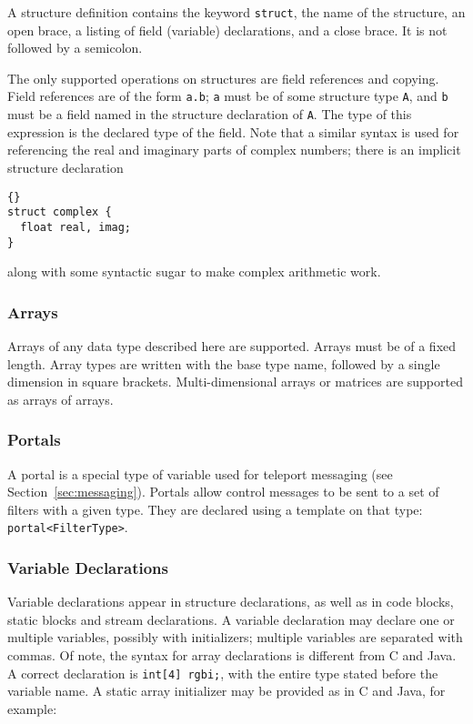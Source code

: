 \documentclass[11pt]{article}
\begin{document}
A structure definition contains the keyword \lstinline|struct|, the name
of the structure, an open brace, a listing of field (variable)
declarations, and a close brace.  It is not followed by a semicolon.

The only supported operations on structures are field references and
copying.  Field references are of the form \lstinline|a.b|; \lstinline|a| must
be of some structure type \lstinline|A|, and \lstinline|b| must be a field named
in the structure declaration of \lstinline|A|.  The type of this expression
is the declared type of the field.  Note that a similar syntax is used
for referencing the real and imaginary parts of complex numbers; there
is an implicit structure declaration

\begin{lstlisting}{}
struct complex {
  float real, imag;
}
\end{lstlisting}{}

\noindent
along with some syntactic sugar to make complex arithmetic work.

\subsubsection{Arrays}

Arrays of any data type described here are supported.  Arrays must be
of a fixed length.  Array types are written with the base type name,
followed by a single dimension in square brackets.  Multi-dimensional
arrays or matrices are supported as arrays of arrays.

\subsubsection{Portals}

A portal is a special type of variable used for teleport messaging
(see Section~\ref{sec:messaging}).  Portals allow control messages to
be sent to a set of filters with a given type.  They are declared
using a template on that type: \lstinline|portal<FilterType>|.

\subsubsection{Variable Declarations}

Variable declarations appear in structure declarations, as well as in
code blocks, static blocks and stream declarations.  A variable
declaration may declare one or multiple variables, possibly with
initializers; multiple variables are separated with commas.  Of note,
the syntax for array declarations is different from C and Java.  A
correct declaration is \lstinline|int[4] rgbi;|, with the entire type
stated before the variable name.  A static array initializer may be
provided as in C and Java, for example:
\end{document}
